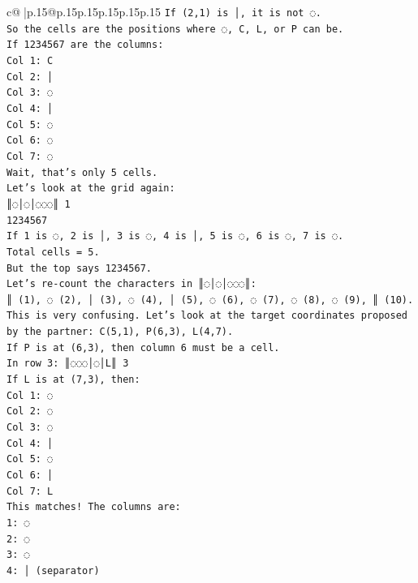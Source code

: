 \documentclass{article}
\begin{document}
{\begin{supertabular}{c@{$\;$}|p{.15\linewidth}@{}p{.15\linewidth}p{.15\linewidth}p{.15\linewidth}p{.15\linewidth}p{.15\linewidth}}
{{{\texttt{If (2,1) is │, it is not ◌.} \\
\texttt{So the cells are the positions where ◌, C, L, or P can be.} \\
\texttt{If 1234567 are the columns:} \\
\texttt{Col 1: C} \\
\texttt{Col 2: │} \\
\texttt{Col 3: ◌} \\
\texttt{Col 4: │} \\
\texttt{Col 5: ◌} \\
\texttt{Col 6: ◌} \\
\texttt{Col 7: ◌} \\
\texttt{Wait, that's only 5 cells.} \\
\texttt{Let's look at the grid again:} \\
\texttt{║◌│◌│◌◌◌║ 1} \\
\texttt{1234567} \\
\texttt{If 1 is ◌, 2 is │, 3 is ◌, 4 is │, 5 is ◌, 6 is ◌, 7 is ◌.} \\
\texttt{Total cells = 5.} \\
\texttt{But the top says 1234567.} \\
\texttt{Let's re{-}count the characters in ║◌│◌│◌◌◌║:} \\
\texttt{║ (1), ◌ (2), │ (3), ◌ (4), │ (5), ◌ (6), ◌ (7), ◌ (8), ◌ (9), ║ (10).} \\
\texttt{This is very confusing. Let's look at the target coordinates proposed by the partner: C(5,1), P(6,3), L(4,7).} \\
\texttt{If P is at (6,3), then column 6 must be a cell.} \\
\texttt{In row 3: ║◌◌◌│◌│L║ 3} \\
\texttt{If L is at (7,3), then:} \\
\texttt{Col 1: ◌} \\
\texttt{Col 2: ◌} \\
\texttt{Col 3: ◌} \\
\texttt{Col 4: │} \\
\texttt{Col 5: ◌} \\
\texttt{Col 6: │} \\
\texttt{Col 7: L} \\
\texttt{This matches! The columns are:} \\
\texttt{1: ◌} \\
\texttt{2: ◌} \\
\texttt{3: ◌} \\
\texttt{4: │ (separator)} \\
}}}
\end{supertabular}}
\end{document}
